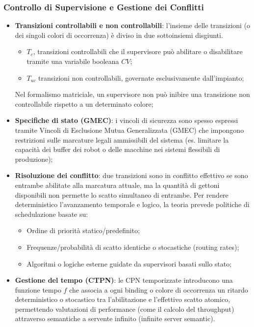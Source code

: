\subsubsection{Controllo di Supervisione e Gestione dei Conflitti}
\begin{itemize}
	\item \textbf{Transizioni controllabili e non controllabili}: l'insieme delle transizioni (o dei singoli colori di occorrenza) è diviso in due sottoinsiemi disgiunti.
	\begin{itemize}
		\item $T_c$, transizioni controllabili che il supervisore può abilitare o disabilitare tramite una variabile booleana $CV$;
		\item $T_{uc}$ transizioni non controllabili, governate esclusivamente dall'impianto;
	\end{itemize}
	Nel formalismo matriciale, un supervisore non può inibire una transizione non controllabile rispetto a un determinato colore;
	\item \textbf{Specifiche di stato (GMEC)}: i vincoli di sicurezza sono spesso espressi tramite Vincoli di Esclusione Mutua Generalizzata (GMEC) che impongono restrizioni sulle marcature legali ammissibili del sistema (es. limitare la capacità dei buffer dei robot o delle macchine nei sistemi flessibili di produzione);
	\item \textbf{Risoluzione dei conflitto}: due transizioni sono in conflitto effettivo se sono entrambe abilitate alla marcatura attuale, ma la quantità di gettoni disponibili non permette lo scatto simultaneo di entrambe. Per rendere deterministico l'avanzamento temporale e logico, la teoria prevede politiche di schedulazione basate su:
	\begin{itemize}
		\item Ordine di priorità statico/predefinito;
		\item Frequenze/probabilità di scatto identiche o stocastiche (routing rates);
		\item Algoritmi o logiche esterne guidate da supervisori basati sullo stato;
	\end{itemize}
	\item \textbf{Gestione del tempo (CTPN)}: le CPN temporizzate introducono una funzione tempo $f$ che associa a ogni binding o colore di occorrenza un ritardo deterministico o stocastico tra l'abilitazione e l'effettivo scatto atomico, permettendo valutazioni di performance (come il calcolo del throughput) attraverso semantiche a servente infinito (infinite server semantic).
\end{itemize}







